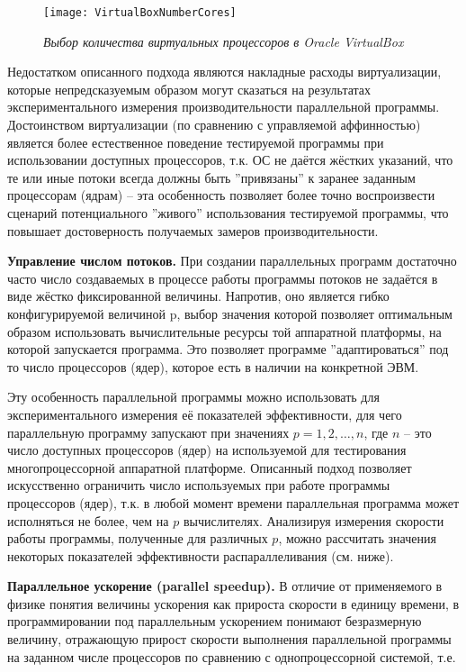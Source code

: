 \begin{figure}[H]
    \texttt{[image: VirtualBoxNumberCores]}
    \caption{\textit{Выбор количества виртуальных процессоров в Oracle VirtualBox}}
    \label{VirtualBoxNumberCores:image}
\end{figure}

Недостатком описанного подхода являются накладные расходы виртуализации, которые непредсказуемым образом могут сказаться на результатах экспериментального измерения производительности параллельной программы. Достоинством виртуализации (по сравнению с управляемой аффинностью) является более естественное поведение тестируемой программы при использовании доступных процессоров, т.к. ОС не даётся жёстких указаний, что те или иные потоки всегда должны быть ''привязаны'' к заранее заданным процессорам (ядрам) – эта особенность позволяет более точно воспроизвести сценарий потенциального ''живого'' использования тестируемой программы, что повышает достоверность получаемых замеров производительности. 

\textbf{Управление числом потоков.} При создании параллельных программ достаточно часто число создаваемых в процессе работы программы потоков не задаётся в виде жёстко фиксированной величины. Напротив, оно является гибко конфигурируемой величиной p, выбор значения которой позволяет оптимальным образом использовать вычислительные ресурсы той аппаратной платформы, на которой запускается программа. Это позволяет программе ''адаптироваться'' под то число процессоров (ядер), которое есть в наличии на конкретной ЭВМ.

Эту особенность параллельной программы можно использовать для экспериментального измерения её показателей эффективности, для чего параллельную программу запускают при значениях $p = 1,2,\dots,n$, где $n$ – это число доступных процессоров (ядер) на используемой для тестирования многопроцессорной аппаратной платформе. Описанный подход позволяет искусственно ограничить число используемых при работе программы процессоров (ядер), т.к. в любой момент времени параллельная программа может исполняться не более, чем на $p$ вычислителях. Анализируя измерения скорости работы программы, полученные для различных $p$, можно рассчитать значения некоторых показателей эффективности распараллеливания (см. ниже).

\textbf{Параллельное ускорение (parallel speedup).} В отличие от применяемого в физике понятия величины ускорения как прироста скорости в единицу времени, в программировании под параллельным ускорением понимают безразмерную величину, отражающую прирост скорости выполнения параллельной программы на заданном числе процессоров по сравнению с однопроцессорной системой, т.е.

